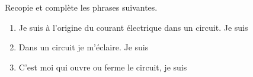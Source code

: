 Recopie et complète les phrases suivantes.
\begin{enumerate}
    \item Je suis à l'origine du courant électrique dans un circuit. Je suis
          \dotline{5cm}
    \item Dans un circuit je m'éclaire. Je suis \dotline{5cm}
    \item C'est moi qui ouvre ou ferme le circuit, je suis \dotline{5cm}
\end{enumerate}



